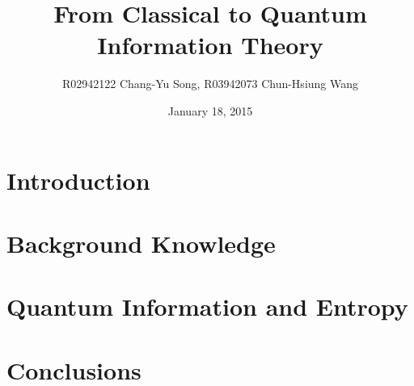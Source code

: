 \documentclass[12pt]{article}
\title{From Classical to Quantum Information Theory}
\author{R02942122 Chang-Yu Song,
        R03942073 Chun-Hsiung Wang}
\date{January 18, 2015}
\begin{document}
\maketitle

\thispagestyle{fancyplain}

\begin{abstract}

\end{abstract}

\section{Introduction}\label{sec:Intro}


\section{Background Knowledge}\label{sec:Background}


\section{Quantum Information and Entropy}\label{sec:QuantumInfo}



%
%

\section{Conclusions}\label{sec:Conclusion}






\appendix

\end{document}
